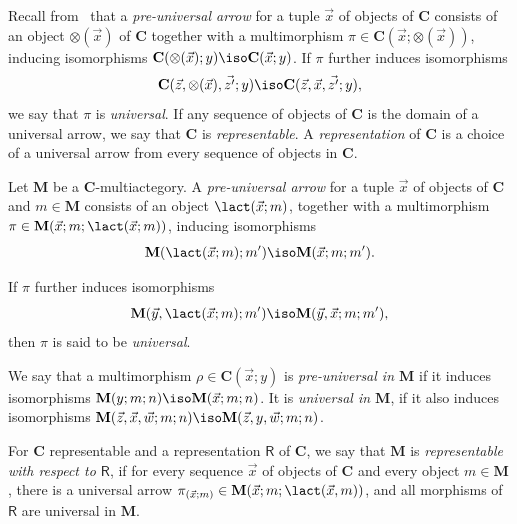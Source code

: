 Recall from~\cite[Chapter~8]{hermida00:repres} that a \emph{pre-universal arrow} for a tuple \(\vec{x}\) of objects of \(\mathbf{C}\)
consists of an object \(\otimes(\vec{x})\) of \(\mathbf{C}\)
together with a multimorphism \(\pi \in \mathbf{C}(\vec{x};\otimes(\vec{x}))\),
inducing isomorphisms \(\mathbf{C}(\otimes(\vec{x});y) \iso \mathbf{C}(\vec{x};y)\).
If \(\pi\) further induces isomorphisms
\[
  \mathbf{C}(\vec{z}, \otimes(\vec{x}), \vec{z'}; y) \iso \mathbf{C}(\vec{z}, \vec{x}, \vec{z'}; y),
\]
we say that \(\pi\) is \emph{universal}.
If any sequence of objects of \(\mathbf{C}\) is the domain of a universal arrow,
we say that \(\mathbf{C}\) is \emph{representable}.
A \emph{representation} of \(\mathbf{C}\) is a choice of a universal arrow from every sequence of objects in \(\mathbf{C}\).

\begin{definition}
  Let \(\mathbf{M}\) be a \(\mathbf{C}\)\hyp{}multiactegory.
  A \emph{pre-universal arrow} for a tuple \(\vec{x}\) of objects of \(\mathbf{C}\)
  and \(m \in \mathbf{M}\)
  consists of an object \(\lact(\vec{x}; m)\),
  together with a multimorphism \(\pi \in \mathbf{M}(\vec{x};m; \lact(\vec{x};m))\),
  inducing isomorphisms
  \[
    \mathbf{M}(\lact(\vec{x};m);m') \iso \mathbf{M}(\vec{x};m;m').
  \]

  If \(\pi\) further induces isomorphisms
  \[
    \mathbf{M}(\vec{y},\lact(\vec{x};m);m') \iso \mathbf{M}(\vec{y},\vec{x};m;m'),
  \]
  then \(\pi\) is said to be \emph{universal}.
\end{definition}

\begin{definition}
  We say that a multimorphism \(\rho \in \mathbf{C}(\vec{x}; y)\) is \emph{pre-universal in \(\mathbf{M}\)}
  if it induces isomorphisms \(\mathbf{M}(y; m; n) \iso \mathbf{M}(\vec{x}; m; n)\).
  It is \emph{universal in \(\mathbf{M}\)}, if it also induces isomorphisms
  \(\mathbf{M}(\vec{z}, \vec{x}, \vec{w}; m; n) \iso \mathbf{M}(\vec{z}, y, \vec{w}; m; n)\).
\end{definition}

\begin{definition}\label{representablemultiactegory}
  For \(\mathbf{C}\) representable and a representation \(\mathsf{R}\) of \(\mathbf{C}\),
  we say that \(\mathbf{M}\) is \emph{representable with respect to \(\mathsf{R}\)},
  if for every sequence \(\vec{x}\) of objects of \(\mathbf{C}\) and every object \(m \in \mathbf{M}\),
  there is a universal arrow \(\pi_{(\vec{x};m)} \in \mathbf{M}(\vec{x};m; \lact(\vec{x},m))\),
  and all morphisms of \(\mathsf{R}\) are universal in \(\mathbf{M}\).
\end{definition}

